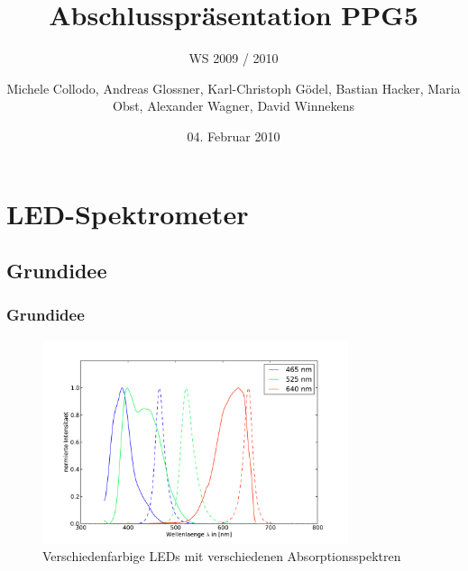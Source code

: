 \documentclass[10pt]{beamer}
\title[Abschlusspr\"asentation]{Abschlusspr\"asentation PPG5}
\subtitle{WS 2009 / 2010}
\author[PPG5]{Michele Collodo, Andreas Glossner, Karl-Christoph G\"odel, Bastian Hacker, Maria Obst, Alexander Wagner, David Winnekens}
\date{04. Februar 2010}
\begin{document}
\frame
{
\titlepage
}

\section{LED-Spektrometer}
\subsection[]{Grundidee}
\frame
{
\frametitle{Grundidee}
\begin{figure}
\begin{center}
\includegraphics[width=0.8\textwidth]{./images/absorp-emit.pdf}
\caption{Verschiedenfarbige LEDs mit verschiedenen Absorptionsspektren}
\end{center}
\end{figure}
}
\end{document}

